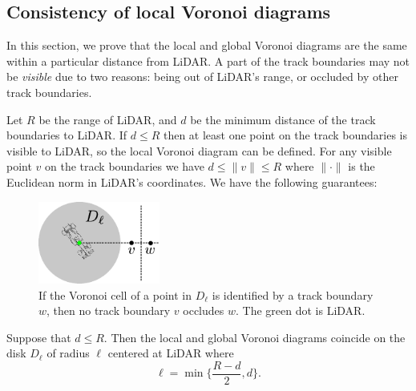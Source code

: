 \subsection{Consistency of local Voronoi diagrams}
\label{sec:localVoronoi}

In this section, we prove that the local and global Voronoi diagrams are the same within a particular distance from LiDAR.
%
A part of the track boundaries may not be \emph{visible} due to two reasons: being out of LiDAR's range, or occluded by other track boundaries.


Let $R$ be the range of LiDAR, 
and $d$ be the minimum distance of the track boundaries to LiDAR.
%
If $d \leq R$ then at least one point on the track boundaries is visible to LiDAR, so the local Voronoi diagram can be defined.
%
For any visible point $v$ on the track boundaries we have $d \leq \lVert v \rVert \leq R$ where $ \lVert \cdot \rVert $ is the Euclidean norm in LiDAR's coordinates.
%
We have the following guarantees:

\begin{figure}
\centering
\includegraphics[width=4cm]{Figures/voronoi_occlusion.pdf}
\caption{If the Voronoi cell of a point in $D_\ell$ is identified by a track boundary $w$, then no track boundary $v$ occludes $w$. The green dot is LiDAR.}
\label{fig:voronoi-global-to-local}
\end{figure}

\begin{theorem}
Suppose that $d \leq R$.
%
Then the local and global Voronoi diagrams coincide on the disk $D_\ell$ of radius $\ell$ centered at LiDAR where
$$
\ell = \min \{ \frac{R-d}{2}, d \}.
$$
\label{thm:voronoi}
\end{theorem}

